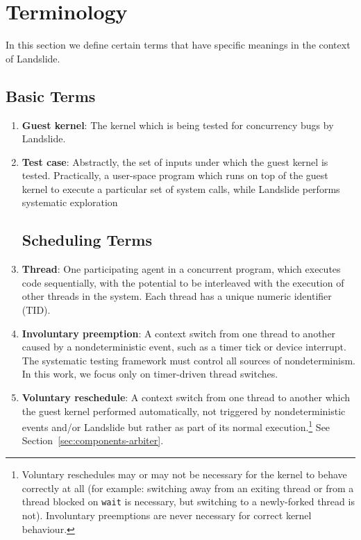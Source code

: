 \section{Terminology}
\label{sec:terminology}

In this section we define certain terms that have specific meanings in the context of Landslide.

\subsection{Basic Terms}

\begin{enumerate}
	\item {\bf Guest kernel}:
		The kernel which is being tested for concurrency bugs by Landslide.
	\item {\bf Test case}:
		Abstractly, the set of inputs under which the guest kernel is tested. Practically, a user-space program which runs on top of the guest kernel to execute a particular set of system calls, while Landslide performs systematic exploration

\subsection{Scheduling Terms}

	\item {\bf Thread}:
		One participating agent in a concurrent program, which executes code sequentially, with the potential to be interleaved with the execution of other threads in the system.
		Each thread has a unique numeric identifier (TID).
	\item {\bf Involuntary preemption}:
		A context switch from one thread to another caused by a nondeterministic event, such as a timer tick or device interrupt. The systematic testing framework must control all sources of nondeterminism. In this work, we focus only on timer-driven thread switches.
	\item {\bf Voluntary reschedule}:
		A context switch from one thread to another which the guest kernel performed automatically, not triggered by nondeterministic events and/or Landslide but rather as part of its normal execution.\footnote{Voluntary reschedules may or may not be necessary for the kernel to behave correctly at all (for example: switching away from an exiting thread or from a thread blocked on \texttt{wait} is necessary, but switching to a newly-forked thread is not). Involuntary preemptions are never necessary for correct kernel behaviour.}
		See Section~\ref{sec:components-arbiter}.


\end{enumerate}
